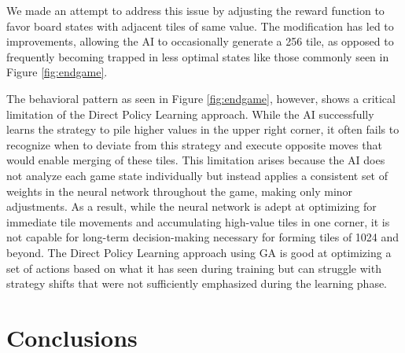 \documentclass[11pt]{article}
\begin{document}
We made an attempt to address this issue by adjusting the reward function to favor board states with adjacent tiles of same value. The modification has led to improvements, allowing the AI to occasionally generate a 256 tile, as opposed to frequently becoming trapped in less optimal states like those commonly seen in Figure \ref{fig:endgame}.

The behavioral pattern as seen in Figure \ref{fig:endgame}, however, shows a critical limitation of the Direct Policy Learning approach. While the AI successfully learns the strategy to pile higher values in the upper right corner, it often fails to recognize when to deviate from this strategy and execute opposite moves that would enable merging of these tiles. This limitation arises because the AI does not analyze each game state individually but instead applies a consistent set of weights in the neural network throughout the game, making only minor adjustments. As a result, while the neural network is adept at optimizing for immediate tile movements and accumulating high-value tiles in one corner, it is not capable for long-term decision-making necessary for forming tiles of 1024 and beyond. The Direct Policy Learning approach using GA is good at optimizing a set of actions based on what it has seen during training but can struggle with strategy shifts that were not sufficiently emphasized during the learning phase.

\section{Conclusions}


\end{document}
